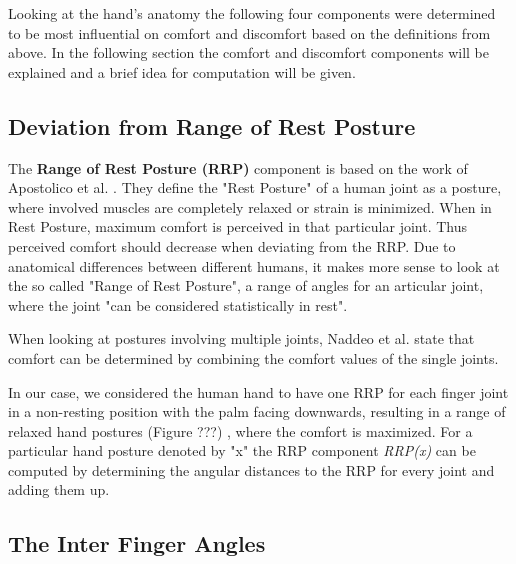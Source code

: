 Looking at the hand's anatomy the following four components were determined to be most influential on comfort and discomfort based on the definitions from above. In the following section the comfort and discomfort components will be explained and a brief idea for computation will be given. 

\subsection{Deviation from Range of Rest Posture}

The \textbf{Range of Rest Posture (RRP)} component is based on the work of Apostolico et al. \cite{apostolico2014postural}. They define the "Rest Posture" of a human joint as a posture, where involved muscles are completely relaxed or strain is minimized. When in Rest Posture, maximum comfort is perceived in that particular joint. Thus perceived comfort should decrease when deviating from the RRP. 
Due to anatomical differences between different humans, it makes more sense to look at the so called "Range of Rest Posture", a range of angles for an articular joint, where the joint "can be considered statistically in rest".

When looking at postures involving multiple joints, Naddeo et al. \cite{naddeo2015proposal} state that comfort can be determined by combining the comfort values of the single joints.

In our case, we considered the human hand to have one RRP for each finger joint in a non-resting position with the palm facing downwards, resulting in a range of relaxed hand postures \colorbox[rgb]{1,0,0}{(Figure ???)}
, where the comfort is maximized. For a particular hand posture denoted by "x" the RRP component \textit{RRP(x)} can be computed by determining the angular distances to the RRP for every joint and adding them up.

\subsection{The Inter Finger Angles}

